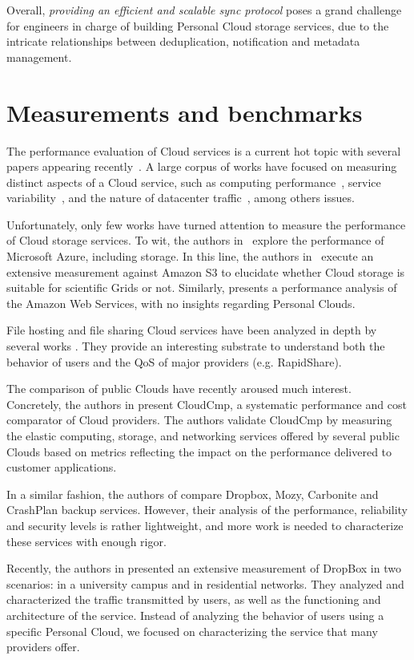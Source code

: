Overall, \textit{providing an efficient and scalable sync protocol} poses a grand challenge for
engineers in charge of building Personal Cloud storage services, due to the intricate
relationships between deduplication, notification and metadata management.

\section{Measurements and benchmarks}
The performance evaluation of Cloud services is a
current hot topic with several papers appearing 
recently~\cite{variability_ccgrid11, nature_data_center_traffic}. A large corpus 
of works have focused on measuring distinct aspects of a Cloud service,
such as computing performance~\cite{ec2benchmarking}, service 
variability~\cite{variability_ccgrid11}, and the nature of 
datacenter traffic~\cite{nature_data_center_traffic}, among
others issues.

Unfortunately, only few works have turned attention to measure the performance
of Cloud storage services. To wit, the authors in~\cite{early_experiences_azure}
explore the performance of Microsoft Azure,
including storage. In this line, the authors in~\cite{s3_grids} execute an extensive
measurement against Amazon S3 to elucidate whether Cloud storage is suitable
for scientific Grids or not.
Similarly, \cite{bergen2011client} presents a performance 
analysis of the Amazon Web Services, with no
insights regarding Personal Clouds.

File hosting and file sharing Cloud services have been analyzed in depth
by several works \cite{imc_rapidshare, one_click_hosting}.
They provide an interesting substrate to understand both
the behavior of users and the QoS of major providers (e.g. RapidShare).

The comparison of public Clouds have recently aroused much
interest. Concretely, the authors in \cite{cloudcmp} present CloudCmp, a systematic
performance and cost comparator of Cloud providers.
The authors validate CloudCmp by measuring the elastic computing, 
storage, and networking services offered by several
public Clouds based on metrics reflecting the impact 
on the performance delivered to customer applications.

In a similar fashion, the authors of \cite{hu2010good} compare Dropbox, Mozy, 
Carbonite and CrashPlan backup services. However, their analysis of 
the performance, reliability and security levels is rather lightweight, and
more work is needed to characterize these services with enough rigor.

Recently, the authors in \cite{drago2012inside} presented an
extensive measurement of DropBox in two scenarios: in a university
campus and in residential networks. They analyzed and characterized the 
traffic transmitted by users, as well as the
functioning and architecture of the service. Instead of analyzing the behavior
of users using a specific Personal Cloud, we focused on
characterizing the service that many providers offer.